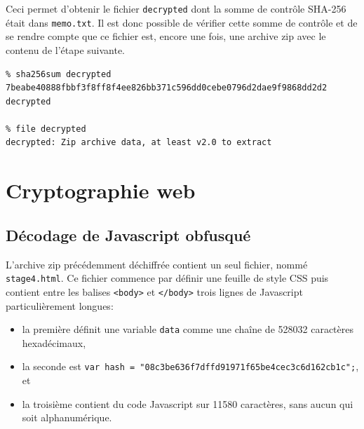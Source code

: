 \documentclass[a4paper,10pt]{article}
\begin{document}
Ceci permet d'obtenir le fichier \texttt{decrypted} dont la somme de contrôle SHA-256 était dans \texttt{memo.txt}.
Il est donc possible de vérifier cette somme de contrôle et de se rendre compte que ce fichier est, encore une fois, une archive zip avec le contenu de l'étape suivante.
\begin{verbatim}
% sha256sum decrypted
7beabe40888fbbf3f8ff8f4ee826bb371c596dd0cebe0796d2dae9f9868dd2d2  decrypted

% file decrypted
decrypted: Zip archive data, at least v2.0 to extract
\end{verbatim}

\clearpage
\section{Cryptographie web}

\subsection{Décodage de Javascript obfusqué}

L'archive zip précédemment déchiffrée contient un seul fichier, nommé \texttt{stage4.html}.
Ce fichier commence par définir une feuille de style CSS puis contient entre les balises \texttt{<body>} et \texttt{</body>} trois lignes de Javascript particulièrement longues:
\begin{itemize}
  \item la première définit une variable \texttt{data} comme une chaîne de 528032 caractères hexadécimaux,
  \item la seconde est \texttt{var hash = "08c3be636f7dffd91971f65be4cec3c6d162cb1c";}, et
  \item la troisième contient du code Javascript sur 11580 caractères, sans aucun qui soit alphanumérique.
\end{itemize}
\end{document}
